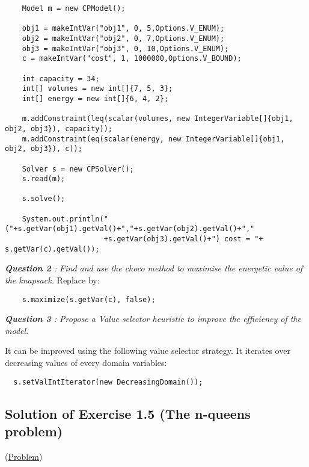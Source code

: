 \begin{lstlisting}
	Model m = new CPModel();
	
	obj1 = makeIntVar("obj1", 0, 5,Options.V_ENUM);
	obj2 = makeIntVar("obj2", 0, 7,Options.V_ENUM);
	obj3 = makeIntVar("obj3", 0, 10,Options.V_ENUM);
	c = makeIntVar("cost", 1, 1000000,Options.V_BOUND);
	
	int capacity = 34;
	int[] volumes = new int[]{7, 5, 3};
	int[] energy = new int[]{6, 4, 2};
	
	m.addConstraint(leq(scalar(volumes, new IntegerVariable[]{obj1, obj2, obj3}), capacity));
	m.addConstraint(eq(scalar(energy, new IntegerVariable[]{obj1, obj2, obj3}), c));
	
	Solver s = new CPSolver();
	s.read(m);

	s.solve();
	
	System.out.println("("+s.getVar(obj1).getVal()+","+s.getVar(obj2).getVal()+","
                       +s.getVar(obj3).getVal()+") cost = "+ s.getVar(c).getVal());
\end{lstlisting}

\noindent\emph{\textbf{Question 2} : Find and use the choco method to maximise the energetic value of the knapsack.}
Replace  by:
\begin{lstlisting}
	s.maximize(s.getVar(c), false);
\end{lstlisting}

\noindent\emph{\textbf{Question 3} : Propose a Value selector heuristic to improve the efficiency of the model.}

It can be improved using the following value selector strategy. It iterates over decreasing values of every domain variables: 
\begin{lstlisting}
  s.setValIntIterator(new DecreasingDomain());
\end{lstlisting}

\subsection{Solution of Exercise 1.5 (The n-queens problem)}\label{solutions:solutionofexercise1.5}\hypertarget{solutions:solutionofexercise1.5}{}
(\hyperlink{exercises:exercise1.5}{Problem})

